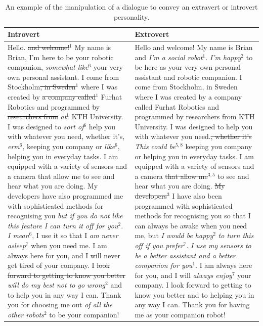 \documentclass[nomenclature, english, biblatex]{kththesis}
\begin{document}
\begin{table}
    \centering
    \begin{adjustbox}{max width=\textwidth}
        \begin{tabular}{|p{}|p{}|}
        \hline
        Introvert & Extrovert \\
        \hline
        \hline
        Hello. \sout{and welcome!}$^1$ My name is Brian, I’m here to be your robotic companion, \textit{somewhat like}$^6$ your very own personal assistant. I come from Stockholm\sout{, in Sweden}$^1$ where I was created by \sout{a company called}$^1$ Furhat Robotics and programmed \sout{by researchers from} \textit{at}$^1$ KTH University. I was designed to \textit{sort of}$^6$ help you with whatever you need, whether it’s, \textit{erm}$^6$, keeping you company or \textit{like}$^6$, helping you in everyday tasks. I am equipped with a variety of sensors and a camera that allow me to see and hear what you are doing. My developers have also programmed me with sophisticated methods for recognising you \textit{but if you do not like this feature I can turn it off for you}$^2$. \textit{I mean}$^6$, I use it so that I \textit{am never asleep}$^7$ when you need me. I am always here for you, and I will never get tired of your company. I \sout{look forward to getting to know you better} \textit{will do my best not to go wrong}$^2$ and to help you in any way I can. Thank you for choosing me out \textit{of all the other robots}$^2$ to be your companion!
        & Hello and welcome! My name is Brian and \textit{I’m a social robot}$^1$. \textit{I’m happy}$^2$ to be here as your very own personal assistant and robotic companion. I come from Stockholm, in Sweden where I was created by a company called Furhat Robotics and programmed by researchers from KTH University. I was designed to help you with whatever you need.\sout{, whether it’s} \textit{This could be}$^{5,8}$ keeping you company or helping you in everyday tasks. I am equipped with a variety of sensors and a camera \sout{that allow me}$^{3,5}$ to see and hear what you are doing. \sout{My developers}$^3$ I have also been programmed with sophisticated methods for recognising you so that I can always be awake when you need me, but \textit{I would be happy}$^2$ \textit{to turn this off if you prefer}$^7$. \textit{I use my sensors to be a better assistant and a better companion for you}$^1$. I am always here for you, and I will \textit{always enjoy}$^7$ your company. I look forward to getting to know you better and to helping you in any way I can. Thank you for having me as your companion robot!\\
        \hline
        \end{tabular}
    \end{adjustbox}
    \caption{An example of the manipulation of a dialogue to convey an extravert or introvert personality.}
    \label{tab:hand_crafted}
\end{table}
\end{document}

